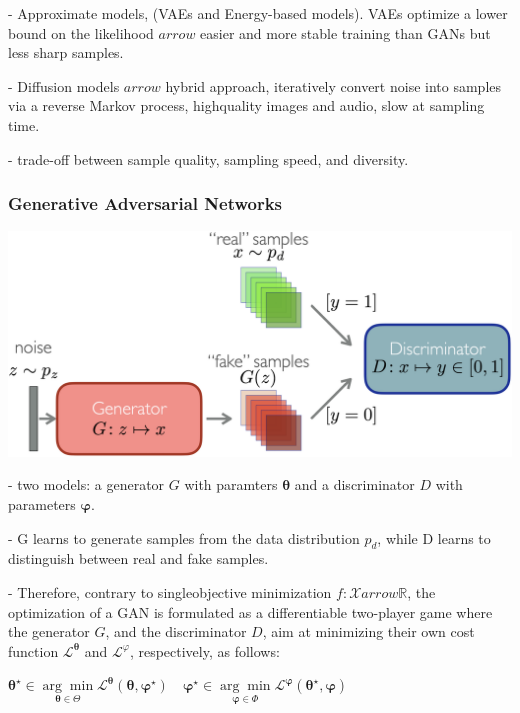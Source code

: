 - Approximate models, (VAEs and Energy-based models). VAEs optimize a lower bound on the likelihood $arrow$ easier and more stable training than GANs but less sharp samples.

- Diffusion models $arrow$ hybrid approach, iteratively convert noise into samples via a reverse Markov process, highquality images and audio, slow at sampling time.


- trade-off between sample quality, sampling speed, and diversity.





\subsubsection*{Generative Adversarial Networks}
\includegraphics*[width=0.9\columnwidth]{figures/generative_GAN.png}

- two models: a generator $G$ with paramters $\boldsymbol{\theta}$ and a discriminator $D$ with parameters $\boldsymbol{\varphi}$. 

- G learns to generate samples from the data distribution $p_{d}$, while D learns to distinguish between real and fake samples. 

- Therefore, contrary to singleobjective minimization $f: \mathcal{X} arrow \mathbb{R}$, the optimization of a GAN is formulated as a differentiable two-player game where the generator $G$, and the discriminator $D$, aim at minimizing their own cost function $\mathcal{L}^{\boldsymbol{\theta}}$ and $\mathcal{L}^{\varphi}$, respectively, as follows:

$\boldsymbol{\theta}^{\star} \in \underset{\boldsymbol{\theta} \in \Theta}{\arg \min } \mathcal{L}^{\boldsymbol{\theta}}(\boldsymbol{\theta}, \boldsymbol{\varphi}^{\star}) \quad \boldsymbol{\varphi}^{\star} \in \underset{\boldsymbol{\varphi} \in \Phi}{\arg \min } \mathcal{L}^{\boldsymbol{\varphi}}(\boldsymbol{\theta}^{\star}, \boldsymbol{\varphi})$


